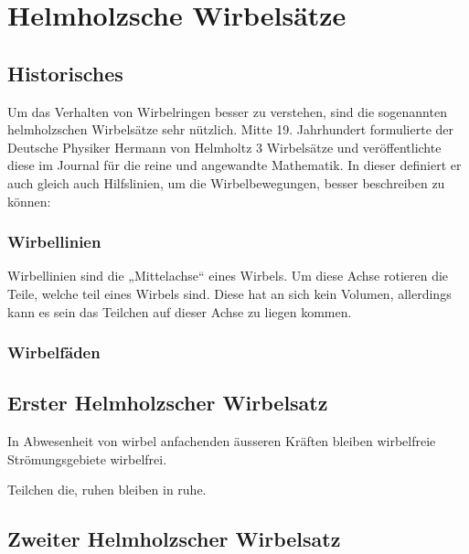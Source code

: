 \section{Helmholzsche Wirbelsätze}

\subsection{Historisches}

Um das Verhalten von Wirbelringen besser zu verstehen, sind die sogenannten helmholzschen Wirbelsätze sehr nützlich. 
Mitte 19. Jahrhundert formulierte der Deutsche Physiker Hermann von Helmholtz 3 Wirbelsätze und veröffentlichte diese im Journal für die reine und angewandte Mathematik\cite{Wirbelringe:JournalHelmholz}.
In dieser definiert er auch gleich auch Hilfslinien, um die Wirbelbewegungen, besser beschreiben zu können:

\subsubsection*{Wirbellinien}

Wirbellinien sind die „Mittelachse“ eines Wirbels. 
Um diese Achse rotieren die Teile, welche teil eines Wirbels sind. 
Diese hat an sich kein Volumen, allerdings kann es sein das Teilchen auf dieser Achse zu liegen kommen. 

\subsubsection*{Wirbelfäden}



\subsection{Erster Helmholzscher Wirbelsatz}

\begin{displayquote}
    In Abwesenheit von wirbel anfachenden äusseren Kräften bleiben wirbelfreie Strömungsgebiete wirbelfrei.
\end{displayquote}

Teilchen die, ruhen bleiben in ruhe.



\subsection{Zweiter Helmholzscher Wirbelsatz}

